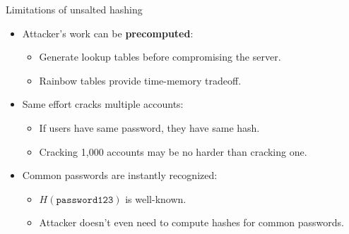 \documentclass[aspectratio=169, lualatex, handout]{beamer}
\begin{document}
\begin{frame}{Limitations of unsalted hashing}
	\begin{itemize}[<+->]
		\item Attacker's work can be \textbf{precomputed}:
		      \begin{itemize}
			      \item Generate lookup tables before compromising the server.
			      \item Rainbow tables provide time-memory tradeoff.
		      \end{itemize}
		\item Same effort cracks multiple accounts:
		      \begin{itemize}
			      \item If users have same password, they have same hash.
			      \item Cracking 1,000 accounts may be no harder than cracking one.
		      \end{itemize}
		\item Common passwords are instantly recognized:
		      \begin{itemize}
			      \item $H(\texttt{password123})$ is well-known.
			      \item Attacker doesn't even need to compute hashes for common passwords.
		      \end{itemize}
	\end{itemize}
\end{frame}
\end{document}
